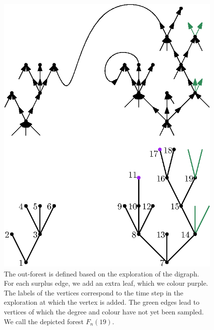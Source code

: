 \begin{figure}
    \centering
    \includegraphics[scale=0.8]{Content/Pictures/configuration_model_out_forest.eps}
    \caption{The out-forest is defined based on the exploration of the digraph. For each surplus edge, we add an extra leaf, which we colour purple. The labels of the vertices correspond to the time step in the exploration at which the vertex is added. The green edges lead to vertices of which the degree and colour have not yet been sampled. We call the depicted forest $\hat{F}_n(19)$.}
    \label{fig.configuration modeloutforest}
\end{figure}

